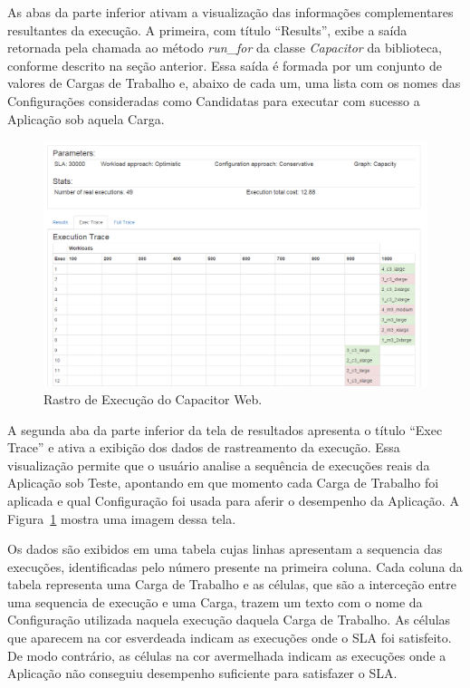 As abas da parte inferior ativam a visualização das informações complementares 
resultantes da execução. A primeira, com título ``Results'', exibe a saída 
retornada pela chamada ao método \emph{run\_for} da classe \emph{Capacitor} da 
biblioteca, conforme descrito na seção anterior. Essa saída é formada por um 
conjunto de valores de Cargas de Trabalho e, abaixo de cada um, uma lista com os 
nomes das Configurações consideradas como Candidatas para executar com sucesso a 
Aplicação sob aquela Carga.  

\begin{figure}[t]
  \begin{center}
    \includegraphics[width=\linewidth]{img/CapacitorWeb_ExecutionTrace}
  \end{center}
  \caption{\label{fig:capacitor_web_trace}Rastro de Execução do Capacitor Web.}
\end{figure}

A segunda aba da parte inferior da tela de resultados apresenta o título 
``Exec Trace'' e ativa a exibição dos dados de rastreamento da execução. Essa
visualização permite que o usuário analise a sequência de execuções reais da 
Aplicação sob Teste, apontando em que momento cada Carga de Trabalho foi aplicada
e qual Configuração foi usada para aferir o desempenho da Aplicação. A 
Figura~\ref{fig:capacitor_web_trace} mostra uma imagem dessa tela.

Os dados são exibidos em uma tabela cujas linhas apresentam a sequencia das 
execuções, identificadas pelo número presente na primeira coluna. Cada coluna da
tabela representa uma Carga de Trabalho e as células, que são a interceção entre
uma sequencia de execução e uma Carga, trazem um texto com o nome da Configuração 
utilizada naquela execução daquela Carga de Trabalho. As células que aparecem na 
cor esverdeada indicam as execuções onde o SLA foi satisfeito. De modo contrário, 
as células na cor avermelhada indicam as execuções onde a Aplicação não conseguiu 
desempenho suficiente para satisfazer o SLA.
 
